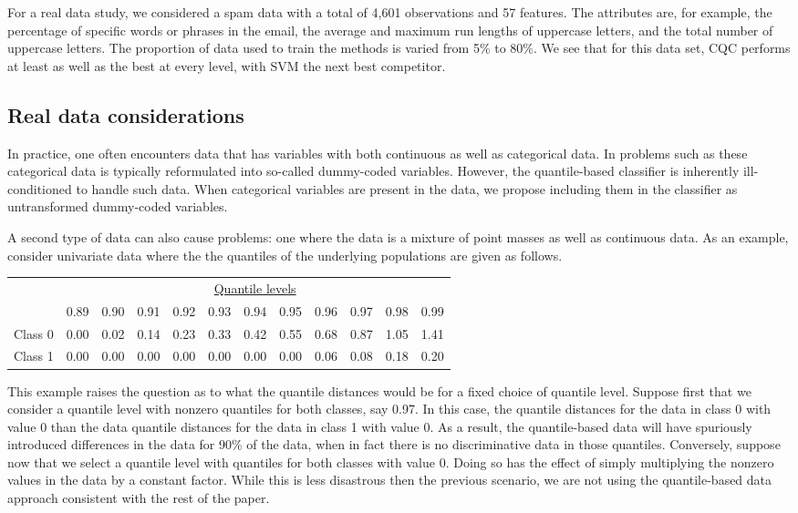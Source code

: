 For a real data study, we considered a spam data with a total of 4,601
observations and 57 features.  The attributes are, for example, the percentage
of specific words or phrases in the email, the average and maximum run lengths
of uppercase letters, and the total number of uppercase letters.  The proportion
of data used to train the methods is varied from 5\% to 80\%.  We see that for
this data set, CQC performs at least as well as the best at every level, with
SVM the next best competitor.



\subsection{Real data considerations}

In practice, one often encounters data that has variables with both continuous
as well as categorical data.  In problems such as these categorical data is
typically reformulated into so-called dummy-coded variables.  However, the
quantile-based classifier is inherently ill-conditioned to handle such data.
When categorical variables are present in the data, we propose including them in
the classifier as untransformed dummy-coded variables.

A second type of data can also cause problems:  one where the data is a mixture
of point masses as well as continuous data.  As an example, consider univariate
data where the the quantiles of the underlying populations are given as follows.
\begin{center}
  \begin{tabular}{lrrrrrrrrrrr}
    \toprule
    & \multicolumn{11}{c}{\underline{Quantile levels}} \\
    & 0.89 & 0.90 & 0.91 & 0.92 & 0.93 & 0.94 & 0.95 & 0.96 & 0.97 & 0.98 & 0.99 \\
    \midrule
    Class 0 & 0.00 & 0.02 & 0.14 & 0.23 & 0.33 & 0.42 & 0.55 & 0.68 & 0.87 & 1.05 & 1.41 \\
    Class 1 & 0.00 & 0.00 & 0.00 & 0.00 & 0.00 & 0.00 & 0.00 & 0.06 & 0.08 & 0.18 & 0.20 \\
    \bottomrule
  \end{tabular}
\end{center}
This example raises the question as to what the quantile distances would be for
a fixed choice of quantile level.  Suppose first that we consider a quantile
level with nonzero quantiles for both classes, say 0.97.  In this case, the
quantile distances for the data in class 0 with value 0 than the data quantile
distances for the data in class 1 with value 0.  As a result, the quantile-based
data will have spuriously introduced differences in the data for 90\% of the
data, when in fact there is no discriminative data in those quantiles.
Conversely, suppose now that we select a quantile level with quantiles for both
classes with value 0.  Doing so has the effect of simply multiplying the nonzero
values in the data by a constant factor.  While this is less disastrous then the
previous scenario, we are not using the quantile-based data approach consistent
with the rest of the paper.

